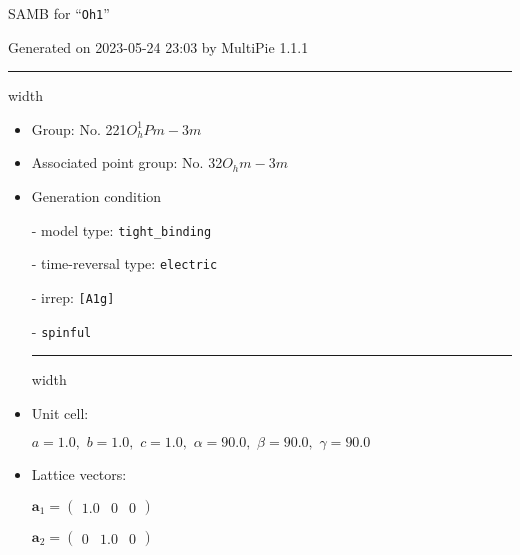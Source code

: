 \documentclass[fleqn,10pt,landscape]{article}
\begin{document}
\setcounter{MaxMatrixCols}{16}

\setlength{\baselineskip}{16pt}
\footnotesize
\begin{center}
\LARGE
SAMB for ``\texttt{Oh1}''
\end{center}
\begin{flushright}
Generated on 2023-05-24 23:03 by MultiPie 1.1.1
\end{flushright}
\vspace{1cm}


 \hfil \hrule height 1mm width \textwidth \hfil

\begin{itemize}
\item Group: No. 221\quad$O_{h}^{1}$\quad$Pm-3m$\quad[ cubic ]

\item Associated point group: No. 32\quad$O_{h}$\quad$m-3m$\quad[ cubic ]

\vspace{5mm}

\item Generation condition

\quad - model type: \texttt{tight_binding}

\quad - time-reversal type: \texttt{electric}

\quad - irrep: \texttt{[A1g]}

\quad - \texttt{spinful}


 \hfil \hrule height 1mm width \textwidth \hfil

\item Unit cell:

\quad $a=1.0,\,\, b=1.0,\,\, c=1.0,\,\, \alpha=90.0,\,\, \beta=90.0,\,\, \gamma=90.0$

\item Lattice vectors:

\quad $\bm{a}_1=\begin{pmatrix} 1.0 & 0 & 0 \end{pmatrix}$

\quad $\bm{a}_2=\begin{pmatrix} 0 & 1.0 & 0 \end{pmatrix}$


\end{itemize}
\end{document}

